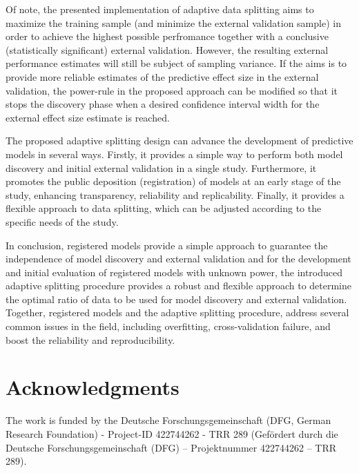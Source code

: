 \documentclass{article}
\begin{document}
Of note, the presented implementation of adaptive data splitting aims to maximize the training sample (and minimize the external validation sample) in order to achieve the highest possible perfromance together with a conclusive (statistically significant) external validation. However, the resulting external performance estimates will still be subject of sampling variance. If the aims is to provide more reliable estimates of the predictive effect size in the external validation, the power-rule in the proposed approach can be modified so that it stops the discovery phase when a desired confidence interval width for the external effect size estimate is reached.

The proposed adaptive splitting design can advance the development of predictive models in several ways. Firstly, it provides a simple way to perform both model discovery and initial external validation in a single study. Furthermore, it promotes the public deposition (registration) of models at an early stage of the study, enhancing transparency, reliability and replicability. Finally, it provides a flexible approach to data splitting, which can be adjusted according to the specific needs of the study.

In conclusion, registered models provide a simple approach to guarantee the independence of model discovery and external validation and for the development and initial evaluation of registered models with unknown power, the introduced adaptive splitting procedure provides a robust and flexible approach to determine the optimal ratio of data to be used for model discovery and external validation. Together, registered models and the adaptive splitting procedure, address several common issues in the field, including overfitting, cross-validation failure, and boost the reliability and reproducibility.
\printglossaries
\section*{Acknowledgments}
The work is funded by the Deutsche Forschungsgemeinschaft (DFG, German Research Foundation) - Project-ID 422744262 - TRR 289 (Gefördert durch die Deutsche Forschungsgemeinschaft (DFG) -- Projektnummer 422744262 -- TRR 289).

\clearpage

\end{document}
